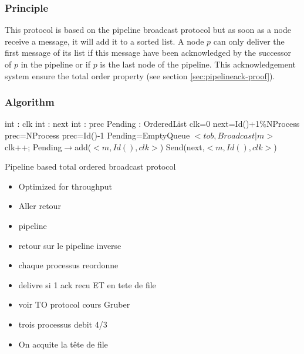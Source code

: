 \documentclass[a4paper]{article}
\begin{document}
        \subsubsection{Principle}
        This protocol is based on the pipeline broadcast protocol but as soon as a node
        receive a message, it will add it to a sorted list. A node $p$ can only deliver the
        first message of its list if this message have been acknowledged by the
        successor of $p$ in the pipeline or if $p$ is the last node of the pipeline.
        This acknowledgement system ensure the total order property (see section
        \ref{sec:pipelineack-proof}).
        \subsubsection{Algorithm}
        \begin{algorithm}[h]
            \centering
                 \begin{algorithmic}
                     \Data
                     \State int : clk
                     \State int : next
                     \State int : prec
                     \State Pending : OrderedList
                     \EndData
                     \Init
                     \State clk=0
                     \State next=Id()+1\%NProcess
                     \State prec=NProcess
                     \Else
                     \State prec=Id()-1
                     \EndIf
                     \State Pending=EmptyQueue
                     \EndInit
                     \Event $< tob,Broadcast | m> $
                     \State clk++;
                     \State Pending$\rightarrow$add($<m,Id(), clk>$) 
                     \State Send(next,$<m,Id(),clk>$)
                     \EndEvent
                 \end{algorithmic}
            \caption{Pipeline based total ordered broadcast protocol}
        \end{algorithm}
        \begin{itemize}
            \item Optimized for throughput
            \item Aller retour
            \item pipeline
            \item retour sur le pipeline inverse
            \item chaque processus reordonne
            \item delivre si 1 ack recu ET en tete de file
            \item voir TO protocol cours Gruber
            \item trois processus debit 4/3
            \item On acquite la tête de file
        \end{itemize}
\end{document}
